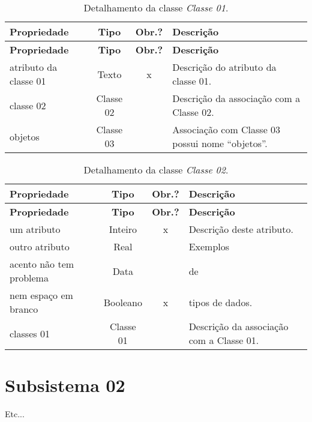 \begin{longtable}{|p{3.5cm}|c|c|p{8cm}|}
	\caption{Detalhamento da classe \emph{Classe 01}.}
	\label{tbl-dicionario-subsistema-primeiro-classe-01} \\\hline 
	
	\rowcolor{lightgray}
	\textbf{Propriedade} & \textbf{Tipo} & \textbf{Obr.?} & \textbf{Descrição} \\\hline
	\endfirsthead
	\hline
	\rowcolor{lightgray}
	\textbf{Propriedade} & \textbf{Tipo} & \textbf{Obr.?} & \textbf{Descrição} \\\hline
	\endhead
	
	atributo da classe 01 	& Texto 	& x & Descrição do atributo da classe 01. \\\hline
	classe 02 				& Classe 02 &	& Descrição da associação com a Classe 02. \\\hline 
	objetos 				& Classe 03 &	& Associação com Classe 03 possui nome ``objetos''. \\\hline 
\end{longtable}


\begin{longtable}{|p{3.5cm}|c|c|p{8cm}|}
	\caption{Detalhamento da classe \emph{Classe 02}.}
	\label{tbl-dicionario-subsistema-primeiro-classe-02} \\\hline 
	
	\rowcolor{lightgray}
	\textbf{Propriedade} & \textbf{Tipo} & \textbf{Obr.?} & \textbf{Descrição} \\\hline
	\endfirsthead
	\hline
	\rowcolor{lightgray}
	\textbf{Propriedade} & \textbf{Tipo} & \textbf{Obr.?} & \textbf{Descrição} \\\hline
	\endhead
	
	um atributo				& Inteiro	& x & Descrição deste atributo. \\\hline
	outro atributo			& Real		& 	& Exemplos \\\hline
	acento não tem problema	& Data		& 	& de \\\hline
	nem espaço em branco	& Booleano	& x	& tipos de dados. \\\hline
	classes 01 				& Classe 01 &	& Descrição da associação com a Classe 01. \\\hline 
\end{longtable}



\section{Subsistema 02}
\label{sec-dicionario-subsistema-segundo}

Etc...